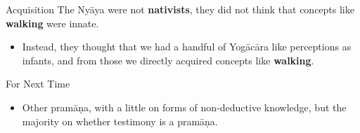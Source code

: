 \documentclass[
  17pt,
  letterpaper,
  ignorenonframetext,
  aspectratio=169,
]{beamer}
\providecommand{\tightlist}{%
  \setlength{\itemsep}{0pt}\setlength{\parskip}{0pt}}\usepackage{longtable,booktabs,array}
\begin{document}
\begin{frame}{Acquisition}
\protect\hypertarget{acquisition}{}
The Nyāya were not \textbf{nativists}, they did not think that concepts
like \textbf{walking} were innate.

\begin{itemize}[<+->]
\tightlist
\item
  Instead, they thought that we had a handful of Yogācāra like
  perceptions as infants, and from those we directly acquired concepts
  like \textbf{walking}.
\end{itemize}
\end{frame}

\begin{frame}{For Next Time}
\protect\hypertarget{for-next-time}{}
\begin{itemize}[<+->]
\tightlist
\item
  Other pramāṇa, with a little on forms of non-deductive knowledge, but
  the majority on whether testimony is a pramāṇa.
\end{itemize}
\end{frame}
\end{document}
